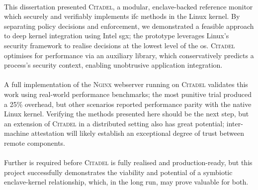 \paragraph{} This dissertation presented \textsc{Citadel}, a modular, enclave-backed reference monitor which securely and verifiably implements \acrshort{ifc} methods in the Linux kernel. By separating policy decisions and enforcement, we demonstrated a feasible approach to deep kernel integration using Intel \acrshort{sgx}; the prototype leverages Linux's security framework to realise decisions at the lowest level of the \acrshort{os}. \textsc{Citadel} optimises for performance via an auxiliary library, which conservatively predicts a process's security context, enabling unobtrusive application integration.

\paragraph{} A full implementation of the \textsc{Nginx} webserver running on \textsc{Citadel} validates this work using real-world performance benchmarks; the most punitive trial produced a 25\% overhead, but other scenarios reported performance parity with the native Linux kernel. Verifying the methods presented here should be the next step, but an extension of \textsc{Citadel} in a distributed setting also has great potential; inter-machine attestation will likely establish an exceptional degree of trust between remote components.


\paragraph{} Further is required before \textsc{Citadel} is fully realised and production-ready, but this project successfully demonstrates the viability and potential of a symbiotic enclave-kernel relationship, which, in the long run, may prove valuable for both.